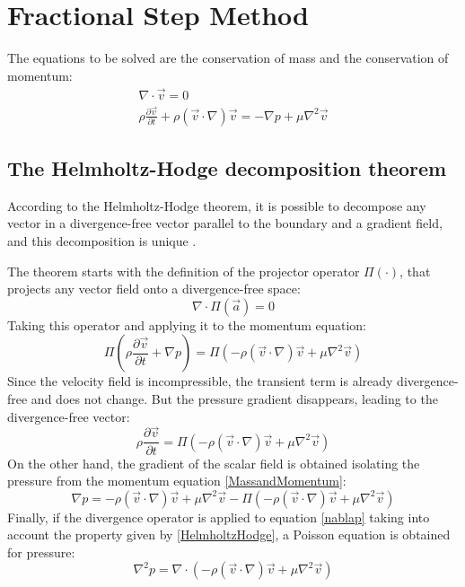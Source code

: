 \chapter{Fractional Step Method}
\label{FractionalStepM}
The equations to be solved are the conservation of mass and the conservation of momentum:
\begin{equation}
\begin{aligned}
\nabla\cdot\vec{v}=0 \\
\rho\frac{\partial\vec{v}}{\partial t}+\rho\left(\vec{v}\cdot\nabla\right)\vec{v}=-\nabla p+\mu\nabla^{2}\vec{v}
\end{aligned}
\label{MassandMomentum}
\end{equation}

\section{The Helmholtz-Hodge decomposition theorem}
According to the Helmholtz-Hodge theorem, it is possible to decompose any vector in a divergence-free vector parallel to the boundary and a gradient field, and this decomposition is unique \cite{CTTC}.

The theorem starts with the definition of the projector operator $\Pi(\cdot)$, that projects any vector field onto a divergence-free space:
\begin{equation}
\nabla\cdot\Pi\left(\vec{a}\right)=0
\label{HelmholtzHodge}
\end{equation}
Taking this operator and applying it to the momentum equation:
\begin{equation}
\Pi\left(\rho\frac{\partial\vec{v}}{\partial t}+\nabla p\right)=\Pi\left(-\rho\left(\vec{v}\cdot\nabla\right)\vec{v}+\mu\nabla^{2}\vec{v}\right)
\end{equation}
Since the velocity field is incompressible, the transient term is already divergence-free and does not change. But the pressure gradient disappears, leading to the divergence-free vector:
\begin{equation}
\rho\frac{\partial\vec{v}}{\partial t}=\Pi\left(-\rho\left(\vec{v}\cdot\nabla\right)\vec{v}+\mu\nabla^{2}\vec{v}\right)
\end{equation}
On the other hand, the gradient of the scalar field is obtained isolating the pressure from the momentum equation \ref{MassandMomentum}:
\begin{equation}
\nabla p=-\rho\left(\vec{v}\cdot\nabla\right)\vec{v}+\mu\nabla^{2}\vec{v}-\Pi\left(-\rho\left(\vec{v}\cdot\nabla\right)\vec{v}+\mu\nabla^{2}\vec{v}\right)
\label{nablap}
\end{equation}
Finally, if the divergence operator is applied to equation \ref{nablap} taking into account the property given by \ref{HelmholtzHodge}, a Poisson equation is obtained for pressure:
\begin{equation}
\nabla^{2}p=\nabla\cdot\left(-\rho\left(\vec{v}\cdot\nabla\right)\vec{v}+\mu\nabla^{2}\vec{v}\right)
\end{equation}

